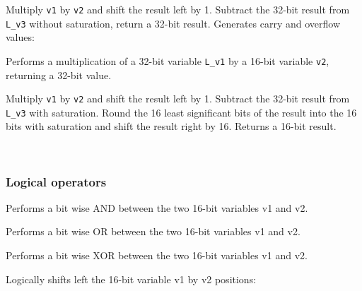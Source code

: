 Multiply {\tt v1} by {\tt v2} and shift the result left by 1.
Subtract the 32-bit result from {\tt L\_v3} without saturation, return a 32-bit result.
Generates carry and overflow values:




Performs a multiplication of a 32-bit variable {\tt L\_v1} by a 16-bit variable {\tt v2}, returning a 32-bit value.


Multiply {\tt v1} by {\tt v2} and shift the result left by 1.
Subtract the 32-bit result from {\tt L\_v3} with saturation.
Round the 16 least significant bits of the result into the 16 bits with saturation and shift the result right by 16.
Returns a 16-bit result.

\ \\

\subsubsection{Logical operators}

 

Performs a bit wise AND between the two 16-bit variables v1 and v2.

 

Performs a bit wise OR between the two 16-bit variables v1 and v2.

 

Performs a bit wise XOR between the two 16-bit variables v1 and v2.

 

Logically shifts left the 16-bit variable v1 by v2 positions:

